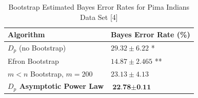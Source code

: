 \documentclass{article}
\begin{document}
	\begin{table}[!h]		
		\caption{Bootstrap Estimated Bayes Error Rates for Pima Indians Data Set [4]}
		\begin{center}
			\begin{tabular}[!h]{ |p{5cm}||p{4cm}|  }
				\hline
				Algorithm & Bayes Error Rate (\%) \\ [0.5ex] 
				\hline\hline
						$D_p$ (no Bootstrap) & $29.32 \pm 6.22$ * \\
						Efron Bootstrap  & $14.87 \pm 2.465$ ** 	\\
						$m < n$ Bootstrap, $m=200$ & $23.13 \pm 4.13$ 	\\
				\textbf{$D_p$ Asymptotic Power Law} & $\textbf{22.78} \pm \textbf{0.11}$\\ 
				\hline 		
			\end{tabular}
		\end{center}
	\end{table}
	
\end{document}

